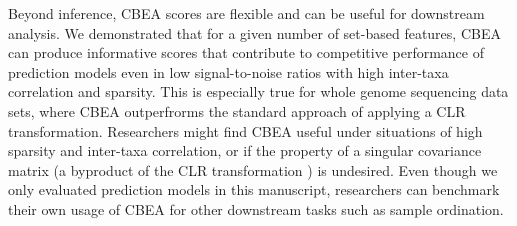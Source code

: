 \documentclass[10pt,letterpaper]{article}
\begin{document}
Beyond inference, CBEA scores are flexible and can be useful for downstream analysis. We demonstrated that for a given number of set-based features, CBEA can produce informative scores that contribute to competitive performance of prediction models even in low signal-to-noise ratios with high inter-taxa correlation and sparsity. This is especially true for whole genome sequencing data sets, where CBEA outperfrorms the standard approach of applying a CLR transformation. Researchers might find CBEA useful under situations of high sparsity and inter-taxa correlation, or if the property of a singular covariance matrix (a byproduct of the CLR transformation \cite{gloor2017}) is undesired. Even though we only evaluated prediction models in this manuscript, researchers can benchmark their own usage of CBEA for other downstream tasks such as sample ordination. 
\end{document}

